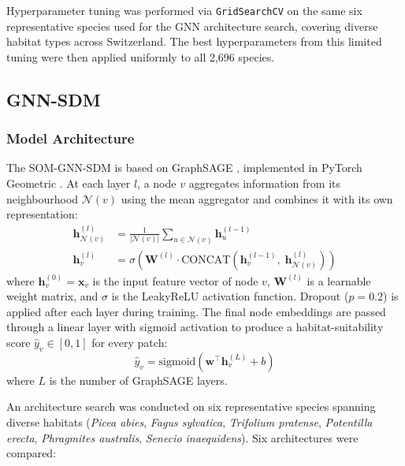 Hyperparameter tuning was performed via \texttt{GridSearchCV} on the same 
six representative species used for the GNN architecture search, covering 
diverse habitat types across Switzerland. The best hyperparameters from 
this limited tuning were then applied uniformly to all
2,696 species.

\subsection{GNN-SDM}
\label{sec:gnn}

\subsubsection{Model Architecture}
\label{sec:architecture}

The SOM-GNN-SDM is based on GraphSAGE \citep{Hamilton2017}, implemented in 
PyTorch Geometric \citep{Fey2019}. At each layer $l$, a node $v$ aggregates 
information from its neighbourhood $\mathcal{N}(v)$ using the mean aggregator 
and combines it with its own representation:
\begin{align}
    \mathbf{h}^{(l)}_{\mathcal{N}(v)} &= \frac{1}{|\mathcal{N}(v)|} 
        \sum_{u \in \mathcal{N}(v)} \mathbf{h}^{(l-1)}_u 
        \label{eq:sage-agg} \\
    \mathbf{h}^{(l)}_v &= \sigma\!\left( 
        \mathbf{W}^{(l)} \cdot 
        \mathrm{CONCAT}\!\left( 
            \mathbf{h}^{(l-1)}_v,\; 
            \mathbf{h}^{(l)}_{\mathcal{N}(v)} 
        \right) 
    \right) \label{eq:sage-update}
\end{align}
where $\mathbf{h}^{(0)}_v = \mathbf{x}_v$ is the input feature vector of 
node $v$, $\mathbf{W}^{(l)}$ is a learnable weight matrix, and $\sigma$ is 
the LeakyReLU activation function. Dropout ($p = 0.2$) is applied after each 
layer during training. The final node embeddings are passed through a linear 
layer with sigmoid activation to produce a habitat-suitability score 
$\hat{y}_v \in [0, 1]$ for every patch:
\begin{equation}
    \hat{y}_v = \mathrm{sigmoid}\!\left( 
        \mathbf{w}^\top \mathbf{h}^{(L)}_v + b 
    \right) \label{eq:sage-output}
\end{equation}
where $L$ is the number of GraphSAGE layers.

An architecture search was conducted on six representative species spanning 
diverse habitats (\textit{Picea abies}, \textit{Fagus sylvatica}, 
\textit{Trifolium pratense}, \textit{Potentilla erecta}, 
\textit{Phragmites australis}, \textit{Senecio inaequidens}). 
Six architectures were compared:

